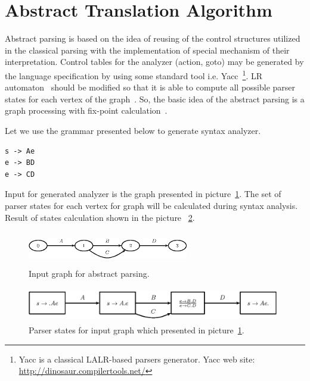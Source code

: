 \section{Abstract Translation Algorithm}
\label{sec:AbstractTranslation}

Abstract parsing is based on the idea of reusing of the control structures utilized in the classical parsing with the 
implementation of special mechanism of their interpretation. Control tables for the analyzer (action, goto) may be generated by
the language specification by using some standard tool i.e. Yacc~\footnote{Yacc is a classical LALR-based parsers generator. 
Yacc web site: \href{http://dinosaur.compilertools.net/}{http://dinosaur.compilertools.net/}}. LR automaton~\cite{Grune} should
be modified so that it is able to compute all possible parser states for each vertex of the graph~\cite{AbstrParsing}. 
So, the basic idea of the abstract parsing is a graph processing with fix-point calculation~\cite{ALVOR2}.

Let we use the grammar presented below to generate syntax analyzer.

\begin{verbatim}
s -> Ae
e -> BD
e -> CD
\end{verbatim}

Input for generated analyzer is the graph presented in picture~\ref{pic2}. The set of parser states for each vertex for 
graph will be calculated during syntax analysis. Result of states calculation shown in the picture ~\ref{pic3}.

\begin{figure}
    \begin{center}
        \includegraphics[width=7cm,height=1.5cm]{graphs/simple_grammar_inpt.eps}
        \caption{Input graph for abstract parsing.}
        \label{pic2}
    \end{center}
\end{figure}

\begin{figure}
    \begin{center}
        \includegraphics[width=11cm,height=1.5cm]{graphs/simple_grammar_items.eps}
        \caption{Parser states for input graph which presented in picture~\ref{pic2}.}
        \label{pic3}
    \end{center}
\end{figure}

